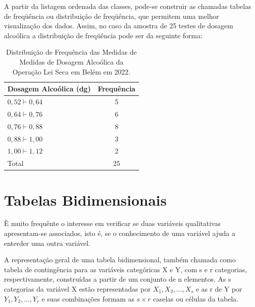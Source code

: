 \newpage

A partir da listagem ordenada das classes, pode-se construir
as chamadas tabelas de freqüência ou distribuição
de freqüência, que permitem uma melhor visualização dos dados.
Assim, no caso da amostra de 25 testes de dosagem alcoólica 
a distribuição de freqüência pode ser da seguinte forma:


\begin{table}[!htb]
    \centering
    {
    \caption{Distribuição de Frequência das Medidas de Medidas de Dosagem Alcoólica da Operação Lei Seca em Belém em 2022.}
    \label{toxalimentar}
    \vspace{-0.1cm}
\begin{tabular}{l|c}
  \hline\hline
  Dosagem Alcoólica (dg) & Frequência \\
  \hline\hline
  $0,52 \vdash 0,64$ & 5 \\
  $0,64 \vdash 0,76$ & 6 \\
  $0,76 \vdash 0,88$ & 8 \\
  $0,88 \vdash 1,00$ & 3 \\
  $1,00 \vdash 1,12$ & 2 \\
  \hline\hline
  Total & 25 \\
    \hline\hline
\end{tabular}}
\end{table}

\newpage

\section{Tabelas Bidimensionais}

È muito frequênte o interesse em verificar se duas variáveis
qualitativas apresentam-se associados, isto é, se o conhecimento de uma
variável ajuda a enterder uma outra variável.\vskip0.3cm


A representação geral de uma tabela bidimensional, também chamada como tabela de contingência
para as variáveis categóricas X e Y, com s e r categorias, respectivamente, construídas a partir de um conjunto de n elementos. As s categorias da variável X estão representadas por $X_{1},X_{2},\ldots,X_{s}$ e as r de Y por $Y_{1},Y_{2},\ldots,Y_{r}$ e suas combinações formam as $s \times r$ caselas ou células da tabela.


